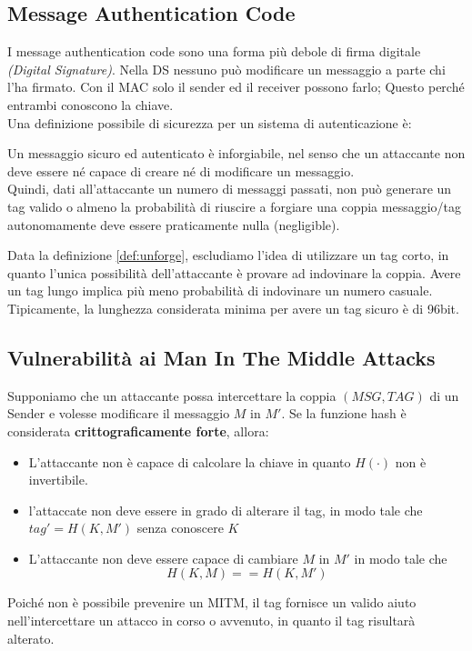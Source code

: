 \subsection{Message Authentication Code}
I message authentication code sono una forma più debole di firma digitale \textit{(Digital Signature)}. Nella DS nessuno può modificare un messaggio a parte chi l'ha firmato. Con il MAC solo il sender ed il receiver possono farlo; Questo perché entrambi conoscono la chiave.\\
Una definizione possibile di sicurezza per un sistema di autenticazione è:
\begin{definition}[Unforgeability]\label{def:unforge}
Un messaggio sicuro ed autenticato è inforgiabile, nel senso che un attaccante non deve essere né capace di creare né di modificare un messaggio.\\
Quindi, dati all'attaccante un numero di messaggi passati, non può generare un tag valido o almeno la probabilità di riuscire a forgiare una coppia messaggio/tag autonomamente deve essere praticamente nulla (negligible). 
\end{definition}
\begin{remark}
Data la definizione \ref{def:unforge}, escludiamo l'idea di utilizzare un tag corto, in quanto l'unica possibilità dell'attaccante è provare ad indovinare la coppia. Avere un tag lungo implica più meno probabilità di indovinare un numero casuale.\\
Tipicamente, la lunghezza considerata minima per avere un tag sicuro è di 96bit.
\end{remark}
\subsection{Vulnerabilità ai Man In The Middle Attacks}
Supponiamo che un attaccante possa intercettare la coppia $(MSG,TAG)$ di un Sender e volesse modificare il messaggio $M$ in $M'$. Se la funzione hash è considerata \textbf{crittograficamente forte}, allora:
\begin{itemize}
    \item L'attaccante non è capace di calcolare la chiave in quanto $H(\cdot)$ non è invertibile.
    \item l'attaccate non deve essere in grado di alterare il tag, in modo tale che $tag'=H(K,M')$ senza conoscere $K$
    \item L'attaccante non deve essere capace di cambiare $M$ in $M'$ in modo tale che \[H(K,M)==H(K,M')\]
\end{itemize}
Poiché non è possibile prevenire un MITM, il tag fornisce un valido aiuto nell'intercettare un attacco in corso o avvenuto, in quanto il tag risultarà alterato.
